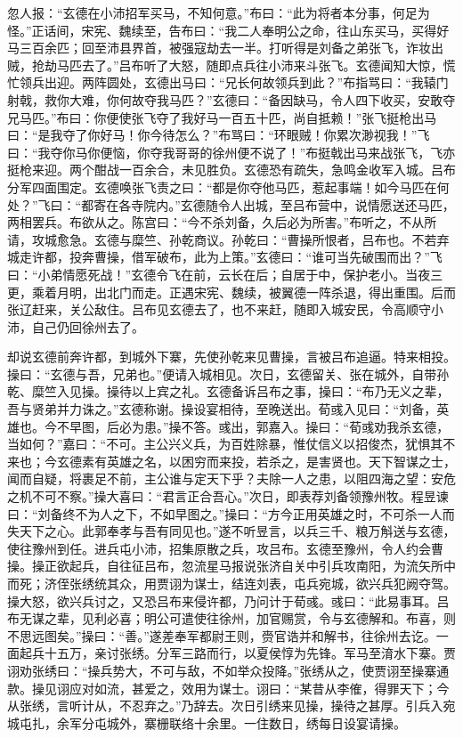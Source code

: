 忽人报：“玄德在小沛招军买马，不知何意。”布曰：“此为将者本分事，何足为怪。”正话间，宋宪、魏续至，告布曰：“我二人奉明公之命，往山东买马，买得好马三百余匹；回至沛县界首，被强寇劫去一半。打听得是刘备之弟张飞，诈妆出贼，抢劫马匹去了。”吕布听了大怒，随即点兵往小沛来斗张飞。玄德闻知大惊，慌忙领兵出迎。两阵圆处，玄德出马曰：“兄长何故领兵到此？”布指骂曰：“我辕门射戟，救你大难，你何故夺我马匹？”玄德曰：“备因缺马，令人四下收买，安敢夺兄马匹。”布曰：你便使张飞夺了我好马一百五十匹，尚自抵赖！”张飞挺枪出马曰：“是我夺了你好马！你今待怎么？”布骂曰：“环眼贼！你累次渺视我！”飞曰：“我夺你马你便恼，你夺我哥哥的徐州便不说了！”布挺戟出马来战张飞，飞亦挺枪来迎。两个酣战一百余合，未见胜负。玄德恐有疏失，急鸣金收军入城。吕布分军四面围定。玄德唤张飞责之曰：“都是你夺他马匹，惹起事端！如今马匹在何处？”飞曰：“都寄在各寺院内。”玄德随令人出城，至吕布营中，说情愿送还马匹，两相罢兵。布欲从之。陈宫曰：“今不杀刘备，久后必为所害。”布听之，不从所请，攻城愈急。玄德与糜竺、孙乾商议。孙乾曰：“曹操所恨者，吕布也。不若弃城走许都，投奔曹操，借军破布，此为上策。”玄德曰：“谁可当先破围而出？”飞曰：“小弟情愿死战！”玄德令飞在前，云长在后；自居于中，保护老小。当夜三更，乘着月明，出北门而走。正遇宋宪、魏续，被翼德一阵杀退，得出重围。后而张辽赶来，关公敌住。吕布见玄德去了，也不来赶，随即入城安民，令高顺守小沛，自己仍回徐州去了。

却说玄德前奔许都，到城外下寨，先使孙乾来见曹操，言被吕布追逼。特来相投。操曰：“玄德与吾，兄弟也。”便请入城相见。次日，玄德留关、张在城外，自带孙乾、糜竺入见操。操待以上宾之礼。玄德备诉吕布之事，操曰：“布乃无义之辈，吾与贤弟并力诛之。”玄德称谢。操设宴相待，至晚送出。荀彧入见曰：“刘备，英雄也。今不早图，后必为患。”操不答。彧出，郭嘉入。操曰：“荀彧劝我杀玄德，当如何？”嘉曰：“不可。主公兴义兵，为百姓除暴，惟仗信义以招俊杰，犹惧其不来也；今玄德素有英雄之名，以困穷而来投，若杀之，是害贤也。天下智谋之士，闻而自疑，将裹足不前，主公谁与定天下乎？夫除一人之患，以阻四海之望：安危之机不可不察。”操大喜曰：“君言正合吾心。”次日，即表荐刘备领豫州牧。程昱谏曰：“刘备终不为人之下，不如早图之。”操曰：“方今正用英雄之时，不可杀一人而失天下之心。此郭奉孝与吾有同见也。”遂不听昱言，以兵三千、粮万斛送与玄德，使往豫州到任。进兵屯小沛，招集原散之兵，攻吕布。玄德至豫州，令人约会曹操。操正欲起兵，自往征吕布，忽流星马报说张济自关中引兵攻南阳，为流矢所中而死；济侄张绣统其众，用贾诩为谋士，结连刘表，屯兵宛城，欲兴兵犯阙夺驾。操大怒，欲兴兵讨之，又恐吕布来侵许都，乃问计于荀彧。彧曰：“此易事耳。吕布无谋之辈，见利必喜；明公可遣使往徐州，加官赐赏，令与玄德解和。布喜，则不思远图矣。”操曰：“善。”遂差奉军都尉王则，赍官诰并和解书，往徐州去讫。一面起兵十五万，亲讨张绣。分军三路而行，以夏侯惇为先锋。军马至淯水下寨。贾诩劝张绣曰：“操兵势大，不可与敌，不如举众投降。”张绣从之，使贾诩至操寨通款。操见诩应对如流，甚爱之，效用为谋士。诩曰：“某昔从李傕，得罪天下；今从张绣，言听计从，不忍弃之。”乃辞去。次日引绣来见操，操待之甚厚。引兵入宛城屯扎，余军分屯城外，寨栅联络十余里。一住数日，绣每日设宴请操。

